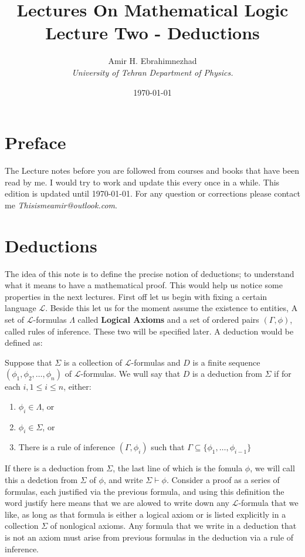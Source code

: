 \documentclass[9pt,a4paper]{article}
\title{Lectures On Mathematical Logic\\ \large Lecture Two - Deductions}
\date{\today}
\author{Amir H. Ebrahimnezhad \\ \small \textit{University of Tehran Department of Physics.}}
\newcommand{\curveL}{\mathcal{L}}
\begin{document}
     \maketitle
     \section*{Preface}
          The Lecture notes before you are followed from courses and books that have been read by me. I would try to work and update this every once in a while. This edition is updated until \today. For any question or corrections please contact me \textit{Thisismeamir@outlook.com}.
     \section*{Deductions}
     The idea of this note is to define the precise notion of deductions; to understand what it means to have a mathematical proof. This would help us notice some properties in the next lectures. First off let us begin with fixing a certain language $\curveL$. Beside this let us for the moment assume the existence to entities, A set of $\curveL$-formulas $\Lambda$ called \textbf{Logical Axioms} and a set of ordered pairs $(\Gamma, \phi)$, called rules of inference. These two will be specified later. A deduction would be defined as:
     \begin{define}
          Suppose that $\Sigma$ is a collection of $\curveL$-formulas and $D$ is a finite sequence $(\phi_1,\phi_2,\dots,\phi_n)$ of $\curveL$-formulas. We wull say that $D$ is a deduction from $\Sigma$ if for each $i,1\leq i\leq n$, either:
          \begin{enumerate}
               \item $\phi_i \in \Lambda$, or 
               \item $\phi_i \in \Sigma$, or
               \item There is a rule of inference $(\Gamma, \phi_i)$ such that $\Gamma\subseteq \{\phi_1,\dots,\phi_{i-1}\}$
          \end{enumerate}
     \end{define}
     If there is a deduction from $\Sigma$, the last line of which is the fomula $\phi$, we will call this a dedction from $\Sigma $ of $\phi$, and write $\Sigma \vdash \phi$. Consider a proof as a series of formulas, each justified via the previous formula, and using this definition the word justify here means that we are alowed to write down any $\curveL$-formula that we like, as long as that formula is either a logical axiom or is listed explicitly in a collection $\Sigma$ of nonlogical axioms. Any formula that we write in a deduction that is not an axiom must arise from previous formulas in the deduction via a rule of inference. 
\end{document}
